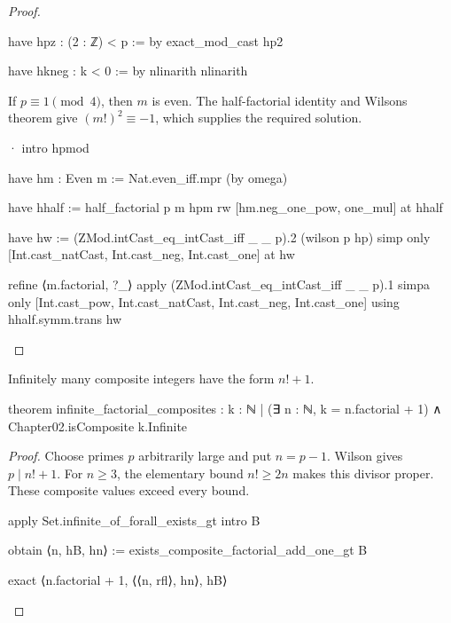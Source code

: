 \begin{proof}
\begin{lean}
    have hpz : (2 : ℤ) < p := by
      exact_mod_cast hp2

    have hkneg : k < 0 := by
      nlinarith
    nlinarith
  \end{lean}

  If $p\equiv1\pmod4$, then $m$ is even.
  The half-factorial identity and Wilson\textquotesingle s theorem give $(m!
    )^2\equiv-1$, which supplies the required solution.

  \begin{lean}
    · intro hpmod

      have hm : Even m := Nat.even_iff.mpr (by omega)

      have hhalf := half_factorial p m hpm
      rw [hm.neg_one_pow, one_mul] at hhalf

      have hw := (ZMod.intCast_eq_intCast_iff _ _ p).2 (wilson p hp)
      simp only [Int.cast_natCast, Int.cast_neg, Int.cast_one] at hw

      refine ⟨m.factorial, ?_⟩
      apply (ZMod.intCast_eq_intCast_iff _ _ p).1
      simpa only [Int.cast_pow, Int.cast_natCast, Int.cast_neg, Int.cast_one] using
        hhalf.symm.trans hw
  \end{lean}
\end{proof}

\begin{theorem}
  \label{ent:thm:infinite-factorial-composites}
  Infinitely many composite integers have the form $n!
    +1$.

  \begin{lean}
    theorem infinite_factorial_composites :
        {k : ℕ | (∃ n : ℕ, k = n.factorial + 1) ∧ Chapter02.isComposite k}.Infinite
  \end{lean}
\end{theorem}

\begin{proof}
  Choose primes $p$ arbitrarily large and put $n=p-1$.
  Wilson gives $p\mid n!
    +1$.
  For $n\ge3$, the elementary bound $n!
    \ge2n$ makes this divisor proper.
  These composite values exceed every bound.

  \begin{lean}
    apply Set.infinite_of_forall_exists_gt
    intro B

    obtain ⟨n, hB, hn⟩ := exists_composite_factorial_add_one_gt B

    exact ⟨n.factorial + 1, ⟨⟨n, rfl⟩, hn⟩, hB⟩
  \end{lean}
\end{proof}
